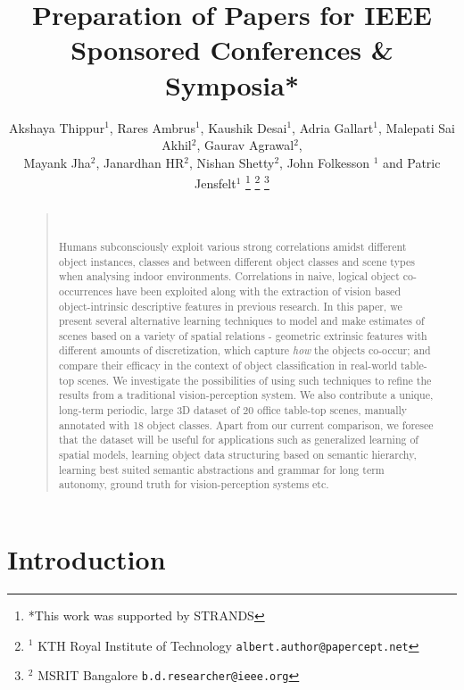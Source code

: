 \documentclass[letterpaper, 10 pt, conference]{ieeeconf}  %
\title{\LARGE \bf
Preparation of Papers for IEEE Sponsored Conferences \& Symposia*
}
\author{Akshaya Thippur$^{1}$, Rares Ambrus$^{1}$, Kaushik Desai$^{1}$, Adria Gallart$^{1}$, Malepati Sai Akhil$^{2}$, Gaurav Agrawal$^{2}$,\\Mayank Jha$^{2}$, Janardhan HR$^{2}$, Nishan Shetty$^{2}$, John Folkesson $^{1}$ and Patric Jensfelt$^{1}$%
\thanks{*This work was supported by STRANDS}%
\thanks{$^{1}$ KTH Royal Institute of Technology
        {\tt\small albert.author@papercept.net}}%
\thanks{$^{2}$ MSRIT Bangalore
        {\tt\small b.d.researcher@ieee.org}}%
}
\begin{document}
\maketitle
\thispagestyle{empty}
\pagestyle{empty}

\begin{abstract}
\begin{quote}\

Humans subconsciously exploit various strong correlations amidst different object instances, classes and between different object classes and scene types when analysing indoor environments. Correlations in naive, logical object co-occurrences have been exploited along with the extraction of vision based object-intrinsic descriptive features in previous research. In this paper, we present several alternative learning techniques to model and make estimates of scenes based on a variety of spatial relations - geometric extrinsic features with different amounts of discretization, which capture \textit{how} the objects co-occur; and compare their efficacy in the context of object classification in real-world table-top scenes. We investigate the possibilities of using such techniques to refine the results from a traditional vision-perception system. We also contribute a unique, long-term periodic, large 3D dataset of 20 office table-top scenes, manually annotated with 18 object classes. Apart from our current comparison, we foresee that the dataset will be useful for applications such as generalized learning of spatial models, learning object data structuring based on semantic hierarchy, learning best suited semantic abstractions and grammar for long term autonomy, ground truth for vision-perception systems etc.

\end{quote}
\end{abstract}


\section{Introduction}
\label{sec:Introduction}
\end{document}
